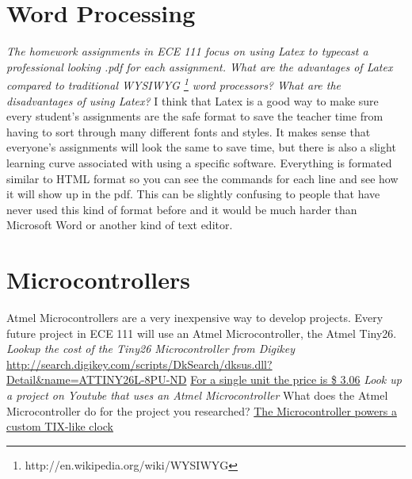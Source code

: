 \documentclass{article}
\begin{document}
\section{Word Processing}
\emph{The homework assignments in ECE 111 focus on using Latex to typecast a professional looking .pdf for each assignment.  What are the advantages of Latex compared to traditional WYSIWYG \footnote{http://en.wikipedia.org/wiki/WYSIWYG} word processors?  What are the disadvantages of using Latex?}
\newline
\newline
I think that Latex is a good way to make sure every student's assignments are the safe format to save the teacher time from having to sort through many different fonts and styles. It makes sense that everyone's assignments will look the same to save time, but there is also a slight learning curve associated with using a specific software. Everything is formated similar to HTML format so you can see the commands for each line and see how it will show up in the pdf. This can be slightly confusing to people that have never used this kind of format before and it would be much harder than Microsoft Word or another kind of text editor. 

\section{Microcontrollers}
Atmel Microcontrollers are a very inexpensive way to develop projects.  Every future project in ECE 111 will use an Atmel Microcontroller, the Atmel Tiny26.\newline
\emph{Lookup the cost of the Tiny26 Microcontroller from Digikey}\newline
\url{http://search.digikey.com/scripts/DkSearch/dksus.dll?Detail&name=ATTINY26L-8PU-ND}\newline
\underline{For a single unit the price is \$ 3.06}\newline
\newline
\emph{Look up a project on Youtube that uses an Atmel Microcontroller}\newline
What does the Atmel Microcontroller do for the project you researched?\newline
\newline
\underline{The Microcontroller powers a custom TIX-like clock}
\end{document}
